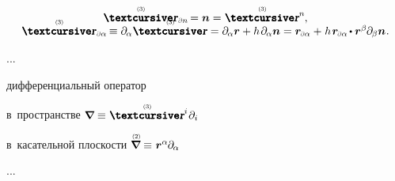 \begin{otherlanguage}{russian}
\nopagebreak\vspace{-0.2em}\begin{equation*}
\begin{array}{c}
\threedimensionallocation_\differentialindex{n} \hspace{-0.25ex} = \unitnormalvector = \threedimensionallocationwithupperindex{n} \hspace{-0.33ex} ,
\\
%
\threedimensionallocation_\differentialindex{\alpha} \hspace{-0.2ex} \equiv \partial_{\hspace{-0.1ex}\alpha} \threedimensionallocation \hspace{-0.15ex}
= \partial_{\hspace{-0.1ex}\alpha} \locationvector + h \hspace{.2ex} \partial_{\hspace{-0.1ex}\alpha} \unitnormalvector
= \locationvector_\differentialindex{\alpha} + \hspace{.1ex} h \hspace{.2ex} \locationvector_\differentialindex{\alpha} \hspace{-0.2ex} \dotp \locationvector^\beta \hspace{-0.1ex} \partial_{\hspace{-0.1ex}\beta} \unitnormalvector
\hspace{.1ex} .
\end{array}
\end{equation*}

...

\noindent
дифференциальный оператор 

в~пространстве ${\boldnabla \equiv \threedimensionallocationwithupperindex{i} \hspace{-0.1ex} \partial_i}$

в~касательной плоскости ${\boldnablaflat \equiv \hspace{.1ex} \locationvector^\alpha \hspace{-0.1ex} \partial_{\hspace{-0.1ex}\alpha}}$

...


\end{otherlanguage}
